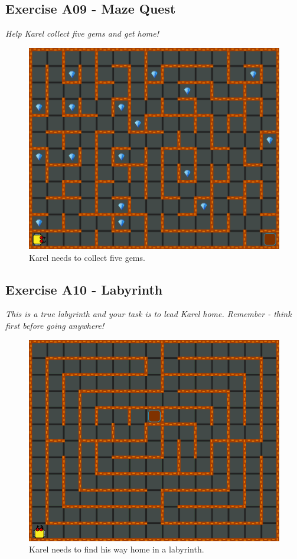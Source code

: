 \documentclass[article,A4,12pt]{llncs}
\begin{document}
\subsection{Exercise A09 - Maze Quest}

{\em​Help Karel collect five gems and get home!}\\[-7mm]

\begin{figure}[!ht]
\begin{center}
\includegraphics[height=0.4\textwidth]{img/a09.png}
\end{center}
\vspace{-4mm}
\caption{Karel needs to collect five gems.}
\label{fig:a09}
\vspace{-4mm}
\end{figure}
\noindent
\newpage

\subsection{Exercise A10 - Labyrinth}

{\em This is a true labyrinth and your task is to lead Karel 
home. Remember - think first before going anywhere!}

\begin{figure}[!ht]
\begin{center}
\includegraphics[height=0.4\textwidth]{img/a10.png}
\end{center}
\vspace{-4mm}
\caption{Karel needs to find his way home in a labyrinth.}
\label{fig:a10}
\vspace{-4mm}
\end{figure}
\noindent
\end{document}
